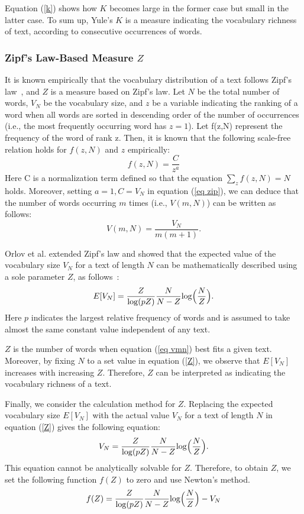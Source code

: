 \documentclass[english]{jnlp_1.4_rep}
\begin{document}
Equation (\ref{k}) shows how $K$ becomes large in the former case but small in the latter case. To sum up, Yule's $K$ is a measure indicating the vocabulary richness of text, according to consecutive occurrences of words.


\subsubsection*{Zipf's Law-Based Measure $Z$}
\label{zipf}

It is known empirically that the vocabulary distribution of a text follows Zipf's law~\cite{Zipf}, and $Z$ is a measure based on Zipf's law. Let $N$ be the total number of words, $V_N$ be the vocabulary size, and $z$ be a variable indicating the ranking of a word when all words are sorted in descending order of the number of occurrences (i.e., the most frequently occurring word has $z=1$). 
Let f(z,N) represent the frequency of the word of rank z.
Then, it is known that the following scale-free relation holds for $f(z,N)$ and $z$ empirically:
\begin{equation}
f(z,N)=\frac{C}{z^a} 
\label{eq zip}
\end{equation}
Here C is a normalization term defined so that the equation $\sum_{z}f(z,N)=N$ holds. Moreover, setting $a=1, C=V_N$ in equation (\ref{eq zip}), we can deduce that the number of words occurring $m$ times (i.e., $V(m,N)$) can be written as follows:
\begin{equation}
V(m,N)=\frac{V_N}{m(m+1)}.  \label{eq vmn}
\end{equation}

Orlov et al. extended Zipf's law and showed that the expected value of the vocabulary size $V_N$ for a text of length $N$ can be mathematically described using a sole parameter $Z$, as follows~\cite{Orlov}: 
\begin{equation}
E[V_N] =  \frac{Z}{{\rm log}(pZ)}\frac{N}{N-Z}{\rm log}\Big(\frac{N}{Z}\Big). \label{Z}
\end{equation}
Here $p$ indicates the largest relative frequency of words and is assumed to take almost the same constant value independent of any text.

$Z$ is the number of words when equation (\ref{eq vmn}) best fits a given text. Moreover, by fixing $N$ to a set value in equation (\ref{Z}), 
we observe that $E[V_N]$ increases with increasing $Z$. Therefore, $Z$ can be interpreted as indicating the vocabulary richness of a text. 

Finally, we consider the calculation method for $Z$. Replacing the expected vocabulary size $E[V_N]$ with the actual value $V_N$ for a text of length $N$ in equation (\ref{Z}) gives the following equation: 
\begin{equation}
V_N=\frac{Z}{{\rm log}(pZ)}\frac{N}{N-Z}{\rm log}\Big(\frac{N}{Z}\Big). 
\end{equation}
This equation cannot be analytically solvable for $Z$. Therefore, to obtain $Z$, we set the following function $f(Z)$ to zero and use Newton's method.
\begin{equation}
f(Z)= \frac{Z}{{\rm log}(pZ)}\frac{N}{N-Z}{\rm log}\Big(\frac{N}{Z}\Big)-V_N
\end{equation}
\end{document}
